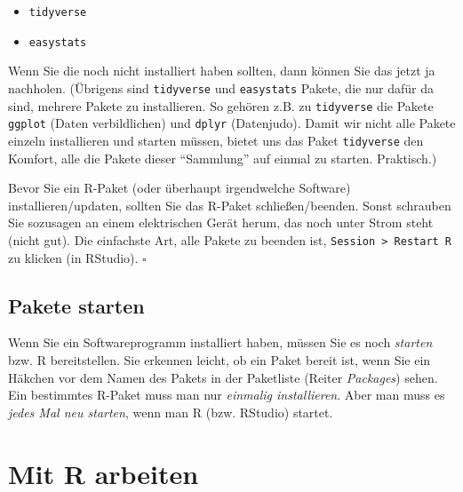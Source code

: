 \documentclass[
  letterpaper,
]{scrbook}
\providecommand{\tightlist}{%
  \setlength{\itemsep}{0pt}\setlength{\parskip}{0pt}}\usepackage{longtable,booktabs,array}
\theoremstyle{definition}
\theoremstyle{definition}
\theoremstyle{definition}
\theoremstyle{remark}
\begin{document}
\begin{itemize}
\tightlist
\item
  \texttt{tidyverse}
\item
  \texttt{easystats}
\end{itemize}

Wenn Sie die noch nicht installiert haben sollten, dann können Sie das
jetzt ja nachholen. (Übrigens sind \texttt{tidyverse} und
\texttt{easystats} Pakete, die nur dafür da sind, mehrere Pakete zu
installieren. So gehören z.B. zu \texttt{tidyverse} die Pakete
\texttt{ggplot} (Daten verbildlichen) und \texttt{dplyr} (Datenjudo).
Damit wir nicht alle Pakete einzeln installieren und starten müssen,
bietet uns das Paket \texttt{tidyverse} den Komfort, alle die Pakete
dieser \enquote{Sammlung} auf einmal zu starten. Praktisch.)

\begin{tcolorbox}[enhanced jigsaw, colbacktitle=quarto-callout-caution-color!10!white, toptitle=1mm, colframe=quarto-callout-caution-color-frame, breakable, toprule=.15mm, bottomrule=.15mm, bottomtitle=1mm, left=2mm, opacitybacktitle=0.6, colback=white, arc=.35mm, coltitle=black, title=\textcolor{quarto-callout-caution-color}{\faFire}\hspace{0.5em}{Vorsicht}, opacityback=0, rightrule=.15mm, leftrule=.75mm, titlerule=0mm]

Bevor Sie ein R-Paket (oder überhaupt irgendwelche Software)
installieren/updaten, sollten Sie das R-Paket schließen/beenden. Sonst
schrauben Sie sozusagen an einem elektrischen Gerät herum, das noch
unter Strom steht (nicht gut). Die einfachste Art, alle Pakete zu
beenden ist, \texttt{Session\ \textgreater{}\ Restart\ R} zu klicken (in
RStudio). \(\square\)

\end{tcolorbox}

\subsection{Pakete starten}\label{pakete-starten}

Wenn Sie ein Softwareprogramm installiert haben, müssen Sie es noch
\emph{starten} bzw. R bereitstellen. Sie erkennen leicht, ob ein Paket
bereit ist, wenn Sie ein Häkchen vor dem Namen des Pakets in der
Paketliste (Reiter \emph{Packages}) sehen. Ein bestimmtes R-Paket muss
man nur \emph{einmalig installieren}. Aber man muss es \emph{jedes Mal
neu starten}, wenn man R (bzw. RStudio) startet.

\section{Mit R arbeiten}\label{mit-r-arbeiten}
\end{document}
